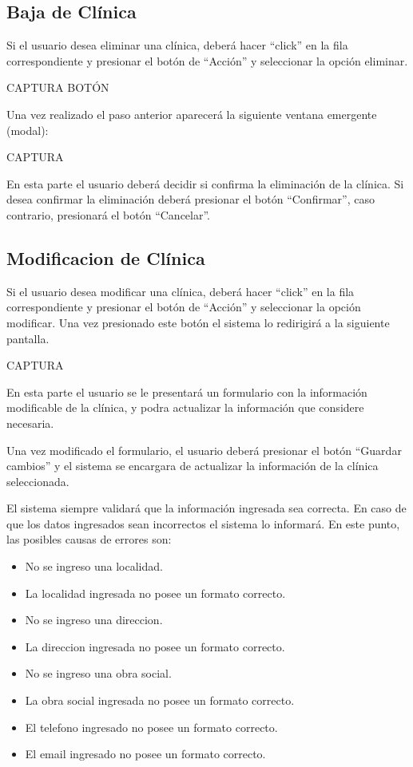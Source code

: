 \documentclass[letterpaper,10pt,spanish]{sphinxmanual}
\begin{document}
\subsection{Baja de Clínica}
\label{clinicas:baja-de-clinica}
Si el usuario desea eliminar una clínica, deberá hacer “click” en la fila correspondiente y presionar el botón de “Acción” y seleccionar la opción eliminar.

CAPTURA BOTÓN

Una vez realizado el paso anterior aparecerá la siguiente ventana emergente (modal):

CAPTURA

En esta parte el usuario deberá decidir si confirma la eliminación de la clínica. Si desea confirmar la eliminación deberá presionar el botón “Confirmar”, caso contrario, presionará el botón “Cancelar”.


\subsection{Modificacion de Clínica}
\label{clinicas:modificacion-de-clinica}
Si el usuario desea modificar una clínica, deberá hacer “click” en la fila correspondiente y presionar el botón de “Acción” y seleccionar la opción modificar.
Una vez presionado este botón el sistema lo redirigirá a la siguiente pantalla.

CAPTURA

En esta parte el usuario se le presentará un formulario con la información modificable de la clínica, y podra actualizar la información que considere necesaria.

Una vez modificado el formulario, el usuario deberá presionar el botón “Guardar cambios” y el sistema se encargara de actualizar la información de la clínica seleccionada.

El sistema siempre validará que la información ingresada sea correcta. En caso de que los datos ingresados sean incorrectos el sistema lo informará.
En este punto, las posibles causas de errores son:
\begin{itemize}
\item {} 
No se ingreso una localidad.

\item {} 
La localidad ingresada no posee un formato correcto.

\item {} 
No se ingreso una direccion.

\item {} 
La direccion ingresada no posee un formato correcto.

\item {} 
No se ingreso una obra social.

\item {} 
La obra social ingresada no posee un formato correcto.

\item {} 
El telefono ingresado no posee un formato correcto.

\item {} 
El email ingresado no posee un formato correcto.

\end{itemize}
\end{document}
